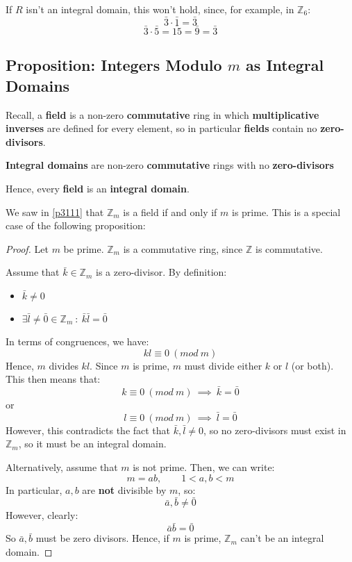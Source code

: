 \documentclass{exam}
\begin{document}
If $R$ isn't an integral domain, this won't hold, since, for example, in $\mathbb{Z}_6$:
\[
\bar{3} \cdot \bar{1} = \bar{3}
\]
\[
\bar{3} \cdot \bar{5} = \overline{15} = \bar{9} = \bar{3}
\]

\subsection{Proposition: Integers Modulo $m$ as Integral Domains}

Recall, a \textbf{field} is a non-zero \textbf{commutative} ring in which \textbf{multiplicative inverses} are defined for every element, so in particular \textbf{fields} contain no \textbf{zero-divisors}.

\bigskip

\textbf{Integral domains} are non-zero \textbf{commutative} rings with no \textbf{zero-divisors}

\bigskip

Hence, every \textbf{field} is an \textbf{integral domain}. 

\bigskip

We saw in \eqref{p3111} that $\mathbb{Z}_m$ is a field if and only if $m$ is prime. This is a special case of the following proposition:


\begin{proof}

Let $m$ be prime. $\mathbb{Z}_m$ is a commutative ring, since $\mathbb{Z}$ is commutative. 

Assume that $\bar{k} \in \mathbb{Z}_m$ is a zero-divisor. By definition:
\begin{itemize}
    \item $\bar{k} \neq 0$
    \item $\exists \bar{l} \neq \bar{0} \in \mathbb{Z}_m \ : \ \bar{k}\bar{l} = \bar{0}$
\end{itemize}
In terms of congruences, we have:
\[
kl \equiv 0 \ (mod \ m)
\]
Hence, $m$ divides $kl$. Since $m$ is prime, $m$ must divide either $k$ or $l$ (or both). This then means that:
\[
k \equiv 0 \ (mod \ m) \ \implies \ \bar{k} = \bar{0}
\]
or
\[
l \equiv 0 \ (mod \ m) \ \implies \ \bar{l} = \bar{0}
\]
However, this contradicts the fact that $\bar{k}, \bar{l} \neq 0$, so no zero-divisors must exist in $\mathbb{Z}_m$, so it must be an integral domain.

\bigskip

Alternatively, assume that $m$ is not prime. Then, we can write:
\[
m = ab, \qquad 1 < a,b < m
\]
In particular, $a,b$ are \textbf{not} divisible by $m$, so:
\[
\bar{a}, \bar{b} \neq \bar{0}
\]
However, clearly:
\[
\bar{a}\bar{b} = \bar{0}
\]
So $\bar{a}, \bar{b}$ must be zero divisors. Hence, if $m$ is prime, $\mathbb{Z}_m$ can't be an integral domain.

\end{proof}
\end{document}
